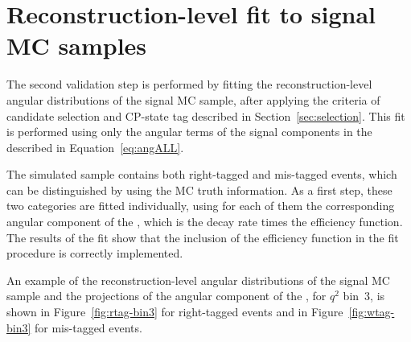 


\section{Reconstruction-level fit to signal MC samples}
\label{sec:fitval-reco}

The second validation step is performed by fitting the reconstruction-level angular distributions of the signal MC sample, after applying the criteria of candidate selection and CP-state tag described in Section~\ref{sec:selection}.
This fit is performed using only the angular terms of the signal components in the \pdf described in Equation~\ref{eq:angALL}.

The simulated sample contains both right-tagged and mis-tagged events, which can be distinguished by using the MC truth information.
As a first step, these two categories are fitted individually, using for each of them the corresponding angular component of the \pdf, which is the decay rate times the efficiency function.
The results of the fit show that the inclusion of the efficiency function in the fit procedure is correctly implemented.

An example of the reconstruction-level angular distributions of the signal MC sample and the projections of the angular component of the \pdf, for $q^2$ bin~3, is shown in Figure~\ref{fig:rtag-bin3} for right-tagged events and in Figure~\ref{fig:wtag-bin3} for mis-tagged events.



